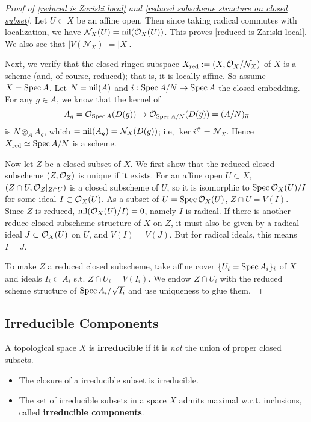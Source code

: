 \begin{proof}[Proof of \cref{reduced is Zariski local} and \cref{reduced subscheme structure on closed subset}]
    Let $U\subset X$ be an affine open.
    Then since taking radical commutes with localization,
    we have $\mathcal{N}_X(U) = \operatorname{nil}(\mathcal{O}_X(U))$.
    This proves \cref{reduced is Zariski local}.
    We also see that $|V(\mathcal{N}_X)| = |X|$.

    Next, we verify that the closed ringed subspace $X_{\operatorname{red}} := (X, \mathcal{O}_X/\mathcal{N}_X)$
    of $X$ is a scheme (and, of course, reduced); that is, it is locally affine. So assume $X = \operatorname{Spec} A$.
    Let $N = \operatorname{nil}(A)$ and $i : \operatorname{Spec} A/N\to \operatorname{Spec} A$ the closed embedding.
    For any $g\in A$,
    we know that the kernel of
    \[A_g = \mathcal{O}_{\operatorname{Spec} A}(D(g))\to \mathcal{O}_{\operatorname{Spec} A/N}(D(\overline g)) = (A/N)_{\overline g}\]
    is $N\otimes_A A_g$,
    which $ = \operatorname{nil}(A_g) = \mathcal{N}_X(D(g))$;
    i.e, $\ker i^\# = \mathcal{N}_X$.
    Hence $X_{\operatorname{red}} \simeq \operatorname{Spec} A/N$ is a scheme.

    Now let $Z$ be a closed subset of $X$.
    We first show that the reduced closed subscheme $(Z, \mathcal{O}_Z)$ is unique if it exists.
    For an affine open $U\subset X$,
    $(Z\cap U, \mathcal{O}_Z|_{Z\cap U})$ is a closed subscheme of $U$,
    so it is isomorphic to $\operatorname{Spec} \mathcal{O}_X(U)/I$
    for some ideal $I\subset \mathcal{O}_X(U)$.
    As a subset of $U = \operatorname{Spec} \mathcal{O}_X(U)$,
    $Z\cap U = V(I)$.
    Since $Z$ is reduced, $\operatorname{nil}(\mathcal{O}_X(U)/I) = 0$,
    namely $I$ is radical.
    If there is another reduce closed subscheme structure of $X$ on $Z$,
    it must also be given by a radical ideal $J\subset\mathcal{O}_X(U)$ on $U$,
    and $V(I) = V(J)$. But for radical ideals, this means $I = J$.

    To make $Z$ a reduced closed subscheme,
    take affine cover $\{U_i = \operatorname{Spec} A_i\}_i$ of $X$
    and ideals $I_i\subset A_i$ s.t. $Z\cap U_i = V(I_i)$.
    We endow $Z\cap U_i$ with the reduced scheme structure of $\operatorname{Spec} A_i/\sqrt{I_i}$ and use uniqueness to glue them.
\end{proof}

\subsection{Irreducible Components}
A topological space $X$ is \textbf{irreducible}
if it is \textit{not} the union of proper closed subsets.
\begin{itemize}
    \item The closure of a irreducible subset is irreducible.
    \item The set of irreducible subsets in a space $X$ admits maximal w.r.t.\! inclusions,
    called \textbf{irreducible components}.
\end{itemize}


